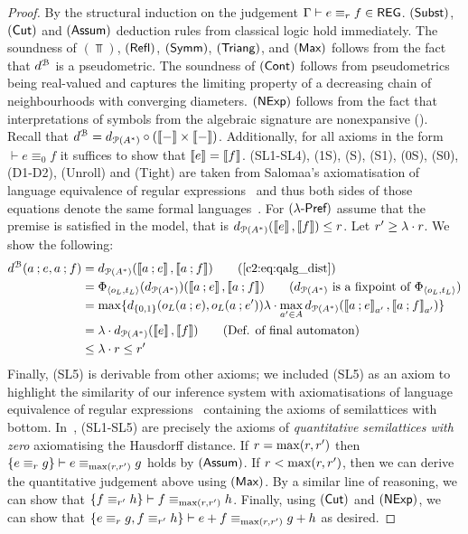 \begin{proof}
By the structural induction on the judgement $\Gamma \vdash e \equiv_{r} f \in \mathsf{REG}$. $(\textsf{Subst})$, $(\textsf{Cut})$ and $(\textsf{Assum})$ deduction rules from classical logic hold immediately. The soundness of $(\Top)$, $(\textsf{Refl})$, $(\textsf{Symm})$, $(\textsf{Triang})$, and $(\textsf{Max})$ follows from the fact that $d^{\mathcal{B}}$ is a pseudometric. The soundness of $(\textsf{Cont})$ follows from pseudometrics being real-valued and captures the limiting property of a decreasing chain of neighbourhoods with converging diameters.  $(\textsf{NExp})$ follows from the fact that interpretations of symbols from the algebraic signature are nonexpansive (). Recall that $d^{\mathcal{B}} = d_{\mathcal{P}({A}^{\ast})} \circ (\left\llbracket{-}\right\rrbracket \times \left\llbracket{-}\right\rrbracket)$. Additionally, for all axioms in the form $\vdash e \equiv_0 f$ it suffices to show that $\left\llbracket{e}\right\rrbracket = \left\llbracket{f}\right\rrbracket$. \textsf{(SL1-SL4)}, \textsf{(1S)}, \textsf{(S)}, \textsf{(S1)}, \textsf{(0S)}, \textsf{(S0)}, \textsf{(D1-D2)}, \textsf{(Unroll)} and \textsf{(Tight)} are taken from Salomaa's axiomatisation of language equivalence of regular expressions~\cite{Salomaa:1966:Two} and thus both sides of those equations denote the same formal languages~\cite[Theorem~5.2]{Wagemaker:2019:Completeness}. For $(\textsf{$\lambda$-Pref})$ assume that the premise is satisfied in the model, that is $d_{\mathcal{P}({A}^{\ast})}(\left\llbracket{e}\right\rrbracket,\left\llbracket{f}\right\rrbracket) \leq r$. Let $r' \geq \lambda \cdot r$. We show the following:
\vspace{-0.5em}
\begin{align*}
    d^{\qalgB}(a \seq e, a \seq f) &= \langmetric(\sem{a \seq e}, \sem{a \seq f}) \tag{\Cref{c2:eq:qalg_dist}}\\
    & = \Phi_{\langle o_L, t_L \rangle}(\langmetric)(\sem{a \seq e}, \sem{a \seq f}) \tag{$\langmetric$ is a fixpoint of $\Phi_{\langle o_L, t_L \rangle}$}\\
    &= \max\{d_{\{0,1\}}(o_L(a \seq e), o_L(a \seq e')) \lambda \cdot \max_{a' \in \alphabet}  \langmetric(\sem{a \seq e}_{a'}, \sem{a \seq f}_{a'} )\}\\
    &= \lambda \cdot \langmetric(\sem{e}, \sem{f}) \tag{Def. of final automaton} \\
    & \leq \lambda \cdot \e \leq \e' \\
\end{align*}
Finally, \textsf{(SL5)} is derivable from other axioms; we included \textsf{(SL5)} as an axiom to highlight the similarity of our inference system with axiomatisations of language equivalence of regular expressions~\cite{Salomaa:1966:Two,Kozen:1994:Completeness} containing the axioms of semilattices with bottom. In~\cite{Mardare:2016:Quantitative}, \textsf{(SL1-SL5)} are precisely the axioms of \emph{quantitative semilattices with zero} axiomatising the Hausdorff distance.  If $r = \max(r, r')$ then $\{e \equiv_r g \} \vdash e \equiv_{\max(r, r')} g$ holds by $(\textsf{Assum})$. If $r < \max(r, r')$, then we can derive the quantitative judgement above using $(\textsf{Max})$. By a similar line of reasoning, we can show that $\{f \equiv_{r'} h \} \vdash f \equiv_{\max(r, r')} h$. Finally, using $(\textsf{Cut})$ and $(\textsf{NExp})$, we can show that $\{e \equiv_{r} g, f \equiv_{r'} h\} \vdash e + f \equiv_{\max(r,r')} g + h$ as desired.
\end{proof}
